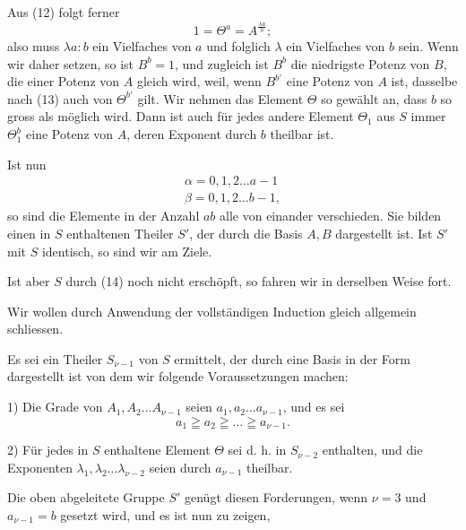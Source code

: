 Aus (12) folgt ferner
\[
1 = \Theta^a = A^{\frac{\lambda a}{b}};
\]
also muss $\lambda a : b$ ein Vielfaches von $a$ und folglich $\lambda$ ein Vielfaches von $b$ sein. Wenn wir daher
setzen, so ist $B^b = 1$, und zugleich ist $B^b$ die niedrigste Potenz von $B$, die einer Potenz von $A$ gleich wird, weil, wenn $B^{b'}$ eine Potenz von $A$ ist, dasselbe nach (13) auch von $\Theta^{b'}$ gilt. Wir nehmen das Element $\Theta$ so gewählt an, dass $b$ so gross als möglich wird. Dann ist auch für jedes andere Element $\Theta_1$ aus $S$ immer $\Theta_1^b$ eine Potenz von $A$, deren Exponent durch $b$ theilbar ist.

Ist nun
\[
\begin{gathered}
\alpha = 0, 1, 2 \ldots a-1 \\
\beta = 0, 1, 2 \ldots b-1,
\end{gathered}
\]
so sind die Elemente
in der Anzahl $ab$ alle von einander verschieden. Sie bilden einen in $S$ enthaltenen Theiler $S'$, der durch die Basis $A, B$ dargestellt ist. Ist $S'$ mit $S$ identisch, so sind wir am Ziele.

Ist aber $S$ durch (14) noch nicht erschöpft, so fahren wir in derselben Weise fort.

Wir wollen durch Anwendung der vollständigen Induction gleich allgemein schliessen.

Es sei ein Theiler $S_{\nu-1}$ von $S$ ermittelt, der durch eine Basis in der Form dargestellt ist
von dem wir folgende Voraussetzungen machen:

1) Die Grade von $A_1, A_2 \ldots A_{\nu-1}$ seien $a_1, a_2 \ldots a_{\nu-1}$, und es sei
\[
a_1 \geqq a_2 \geqq \ldots \geqq a_{\nu-1}.
\]

2) Für jedes in $S$ enthaltene Element $\Theta$ sei
d. h. in $S_{\nu-2}$ enthalten, und die Exponenten $\lambda_1, \lambda_2 \ldots \lambda_{\nu-2}$ seien durch $a_{\nu-1}$ theilbar.

Die oben abgeleitete Gruppe $S'$ genügt diesen Forderungen, wenn $\nu = 3$ und $a_{\nu-1} = b$ gesetzt wird, und es ist nun zu zeigen,
